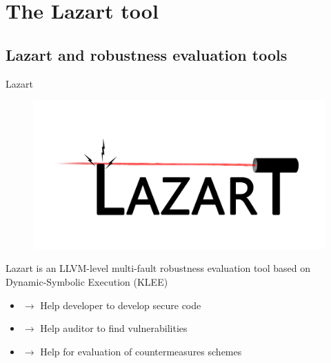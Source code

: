 \section{The Lazart tool}

\subsection{Lazart and robustness evaluation tools}

\begin{frame}[fragile]{Lazart}
\vfill
{\small

    \begin{figure}
        \includegraphics[scale=0.21]{img/lazart-logo-red.png}
    \end{figure}
    
    Lazart \cite{potet2014lazart} is an LLVM-level multi-fault robustness evaluation tool based on Dynamic-Symbolic Execution (KLEE)
    \begin{itemize}
        \item[] $\rightarrow$ Help developer to develop secure code
        \item[] $\rightarrow$ Help auditor to find vulnerabilities
        \item[] $\rightarrow$ Help for evaluation of countermeasures schemes
    \end{itemize}

    \vspace{0.8cm}
    
}
\end{frame}
